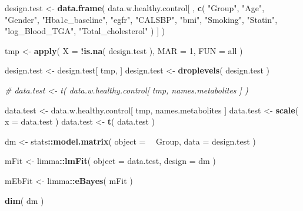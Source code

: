 \documentclass[]{article}
\newenvironment{Shaded}{\begin{snugshade}}{\end{snugshade}}
\newcommand{\CommentTok}[1]{\textcolor[rgb]{0.56,0.35,0.01}{\textit{#1}}}
\newcommand{\DataTypeTok}[1]{\textcolor[rgb]{0.13,0.29,0.53}{#1}}
\newcommand{\DecValTok}[1]{\textcolor[rgb]{0.00,0.00,0.81}{#1}}
\newcommand{\KeywordTok}[1]{\textcolor[rgb]{0.13,0.29,0.53}{\textbf{#1}}}
\newcommand{\NormalTok}[1]{#1}
\newcommand{\OperatorTok}[1]{\textcolor[rgb]{0.81,0.36,0.00}{\textbf{#1}}}
\newcommand{\StringTok}[1]{\textcolor[rgb]{0.31,0.60,0.02}{#1}}
\begin{document}
\begin{Shaded}
\begin{Highlighting}[]
\NormalTok{design.test <-}\StringTok{ }
\StringTok{  }\KeywordTok{data.frame}\NormalTok{( }
\NormalTok{    data.w.healthy.control[ , }
                            \KeywordTok{c}\NormalTok{( }
                              \StringTok{"Group"}\NormalTok{, }
                              \StringTok{"Age"}\NormalTok{, }
                              \StringTok{"Gender"}\NormalTok{, }
                              \StringTok{"Hba1c_baseline"}\NormalTok{, }
                              \StringTok{"egfr"}\NormalTok{, }
                              \StringTok{"CALSBP"}\NormalTok{, }
                              \StringTok{"bmi"}\NormalTok{, }
                              \StringTok{"Smoking"}\NormalTok{,}
                              \StringTok{"Statin"}\NormalTok{,}
                              \StringTok{"log_Blood_TGA"}\NormalTok{, }
                              \StringTok{"Total_cholesterol"}
\NormalTok{                            )}
\NormalTok{                            ]}
\NormalTok{  )}

\NormalTok{tmp <-}\StringTok{ }
\StringTok{  }\KeywordTok{apply}\NormalTok{( }
    \DataTypeTok{X =} \OperatorTok{!}\KeywordTok{is.na}\NormalTok{( design.test ),}
    \DataTypeTok{MAR =} \DecValTok{1}\NormalTok{,}
    \DataTypeTok{FUN =}\NormalTok{ all}
\NormalTok{  )}

\NormalTok{design.test <-}\StringTok{ }\NormalTok{design.test[ tmp, ]}
\NormalTok{design.test <-}\StringTok{ }\KeywordTok{droplevels}\NormalTok{( design.test )}

\CommentTok{# data.test <- t( data.w.healthy.control[ tmp, names.metabolites ] )}

\NormalTok{data.test <-}\StringTok{ }\NormalTok{data.w.healthy.control[ tmp, names.metabolites ]}
\NormalTok{data.test <-}\StringTok{ }\KeywordTok{scale}\NormalTok{( }\DataTypeTok{x =}\NormalTok{ data.test )}
\NormalTok{data.test <-}\StringTok{ }\KeywordTok{t}\NormalTok{( data.test )}

\NormalTok{dm <-}\StringTok{ }
\StringTok{  }\NormalTok{stats}\OperatorTok{::}\KeywordTok{model.matrix}\NormalTok{( }
    \DataTypeTok{object =} \OperatorTok{~}\StringTok{ }\NormalTok{Group,}
    \DataTypeTok{data =}\NormalTok{ design.test}
\NormalTok{  )}

\NormalTok{mFit <-}\StringTok{ }
\StringTok{  }\NormalTok{limma}\OperatorTok{::}\KeywordTok{lmFit}\NormalTok{( }
    \DataTypeTok{object =}\NormalTok{ data.test,}
    \DataTypeTok{design =}\NormalTok{ dm}
\NormalTok{  )}

\NormalTok{mEbFit <-}\StringTok{ }\NormalTok{limma}\OperatorTok{::}\KeywordTok{eBayes}\NormalTok{( mFit )}

\KeywordTok{dim}\NormalTok{( dm )}
\end{Highlighting}
\end{Shaded}
\end{document}
